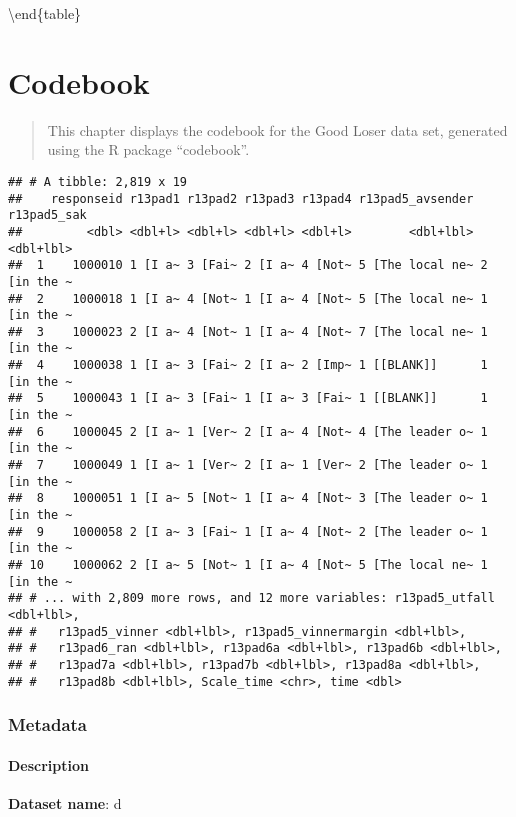 \documentclass[
]{book}
\begin{document}
\textbackslash end\{table\}

\hypertarget{codebook-2}{%
\chapter{Codebook}\label{codebook-2}}

\begin{quote}
This chapter displays the codebook for the Good Loser data set, generated using the R package ``codebook''.
\end{quote}

\begin{verbatim}
## # A tibble: 2,819 x 19
##    responseid r13pad1 r13pad2 r13pad3 r13pad4 r13pad5_avsender r13pad5_sak
##         <dbl> <dbl+l> <dbl+l> <dbl+l> <dbl+l>        <dbl+lbl>   <dbl+lbl>
##  1    1000010 1 [I a~ 3 [Fai~ 2 [I a~ 4 [Not~ 5 [The local ne~ 2 [in the ~
##  2    1000018 1 [I a~ 4 [Not~ 1 [I a~ 4 [Not~ 5 [The local ne~ 1 [in the ~
##  3    1000023 2 [I a~ 4 [Not~ 1 [I a~ 4 [Not~ 7 [The local ne~ 1 [in the ~
##  4    1000038 1 [I a~ 3 [Fai~ 2 [I a~ 2 [Imp~ 1 [[BLANK]]      1 [in the ~
##  5    1000043 1 [I a~ 3 [Fai~ 1 [I a~ 3 [Fai~ 1 [[BLANK]]      1 [in the ~
##  6    1000045 2 [I a~ 1 [Ver~ 2 [I a~ 4 [Not~ 4 [The leader o~ 1 [in the ~
##  7    1000049 1 [I a~ 1 [Ver~ 2 [I a~ 1 [Ver~ 2 [The leader o~ 1 [in the ~
##  8    1000051 1 [I a~ 5 [Not~ 1 [I a~ 4 [Not~ 3 [The leader o~ 1 [in the ~
##  9    1000058 2 [I a~ 3 [Fai~ 1 [I a~ 4 [Not~ 2 [The leader o~ 1 [in the ~
## 10    1000062 2 [I a~ 5 [Not~ 1 [I a~ 4 [Not~ 5 [The local ne~ 1 [in the ~
## # ... with 2,809 more rows, and 12 more variables: r13pad5_utfall <dbl+lbl>,
## #   r13pad5_vinner <dbl+lbl>, r13pad5_vinnermargin <dbl+lbl>,
## #   r13pad6_ran <dbl+lbl>, r13pad6a <dbl+lbl>, r13pad6b <dbl+lbl>,
## #   r13pad7a <dbl+lbl>, r13pad7b <dbl+lbl>, r13pad8a <dbl+lbl>,
## #   r13pad8b <dbl+lbl>, Scale_time <chr>, time <dbl>
\end{verbatim}

\hypertarget{metadata-2}{%
\subsection{Metadata}\label{metadata-2}}

\hypertarget{description-2}{%
\subsubsection{Description}\label{description-2}}

\textbf{Dataset name}: d
\end{document}
